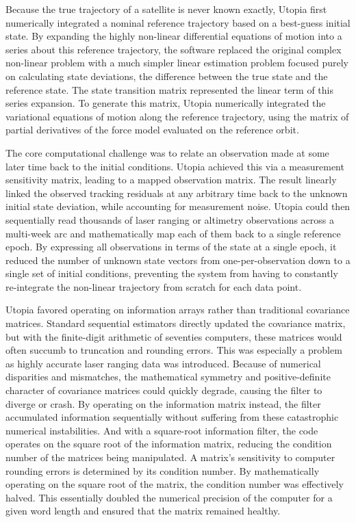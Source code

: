 Because the true trajectory of a satellite is never known exactly, Utopia first numerically integrated a nominal reference trajectory based on a best-guess initial state. By expanding the highly non-linear differential equations of motion into a series about this reference trajectory, the software replaced the original complex non-linear problem with a much simpler linear estimation problem focused purely on calculating state deviations, the difference between the true state and the reference state. The state transition matrix represented the linear term of this series expansion. To generate this matrix, Utopia numerically integrated the variational equations of motion along the reference trajectory, using the matrix of partial derivatives of the force model evaluated on the reference orbit. 

The core computational challenge was to relate an observation made at some later time back to the initial conditions. Utopia achieved this via a measurement sensitivity matrix, leading to a mapped observation matrix. The result linearly linked the observed tracking residuals at any arbitrary time back to the unknown initial state deviation, while accounting for measurement noise. Utopia could then sequentially read thousands of laser ranging or altimetry observations across a multi-week arc and mathematically map each of them back to a single reference epoch. By expressing all observations in terms of the state at a single epoch, it reduced the number of unknown state vectors from one-per-observation down to a single set of initial conditions, preventing the system from having to constantly re-integrate the non-linear trajectory from scratch for each data point.

Utopia favored operating on information arrays rather than traditional covariance matrices. Standard sequential estimators directly updated the covariance matrix, but with the finite-digit arithmetic of seventies computers, these matrices would often succumb to truncation and rounding errors. This was especially a problem as highly accurate laser ranging data was introduced. Because of numerical disparities and mismatches, the mathematical symmetry and positive-definite character of covariance matrices could quickly degrade, causing the filter to diverge or crash. By operating on the information matrix instead, the filter accumulated information sequentially without suffering from these catastrophic numerical instabilities. And with a square-root information filter, the code operates on the square root of the information matrix, reducing the condition number of the matrices being manipulated. A matrix's sensitivity to computer rounding errors is determined by its condition number. By mathematically operating on the square root of the matrix, the condition number was effectively halved. This essentially doubled the numerical precision of the computer for a given word length and ensured that the matrix remained healthy.


